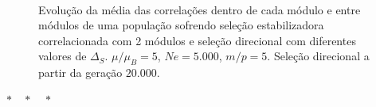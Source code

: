 \begin{figure}[htbp]
   \vspace{-18pt}
   \vspace{11pt}
   \\
   \caption{ Evolução da média das correlações dentro de cada módulo
      e entre módulos de uma população sofrendo seleção estabilizadora
      correlacionada com 2 módulos e seleção direcional com diferentes
   valores de $\Delta_S$. $\mu/\mu_B = 5$, $Ne = 5.000$, $m/p=5$. Seleção
   direcional a partir da geração $20.000$.}
   \label{AVGEntreIntra}
\end{figure}

\centerline { $ * \quad * \quad * $ }

